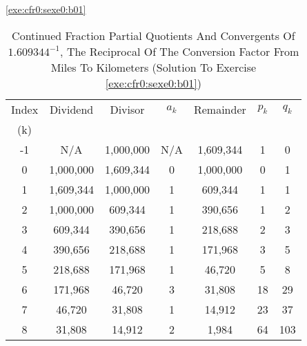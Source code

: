 \begin{vworkexercisesolution}{\ref{exe:cfr0:sexe0:b01}}
\begin{table}
\caption{Continued Fraction Partial Quotients And Convergents Of $1.609344^{-1}$, 
         The Reciprocal Of The Conversion Factor From Miles
         To Kilometers (Solution To Exercise \ccfrzeroxrefhyphen{}\ref{exe:cfr0:sexe0:b01})}
\label{tbl:ccfs0:exe:cfr0:sexe0:b01:01}
\begin{center}
\begin{tabular}{|c|c|c|c|c|c|c|}
\hline
\small{Index}     &      \small{Dividend}  &       \small{Divisor} &  $a_k$ &   \small{Remainder} & $p_k$ & $q_k$ \\
\small{(k)}       &                        &                       &        &                     &       &       \\
\hline
\hline
       \small{-1} & \small{N/A}            & \small{1,000,000}     &     \small{N/A} &   \small{1,609,344}   &      \small{1} &       \small{0}  \\
\hline
       \small{0}  & \small{1,000,000}      & \small{1,609,344}     &     \small{0}   &   \small{1,000,000}   &      \small{0} &       \small{1}  \\
\hline
       \small{1}  & \small{1,609,344}      & \small{1,000,000}     &     \small{1}   &     \small{609,344}   &      \small{1} &       \small{1}  \\
\hline
       \small{2}  & \small{1,000,000}      &   \small{609,344}     &     \small{1}   &     \small{390,656}   &      \small{1} &       \small{2}  \\
\hline
       \small{3}  &   \small{609,344}      &   \small{390,656}     &     \small{1}   &     \small{218,688}   &      \small{2} &       \small{3}  \\
\hline
       \small{4}  &   \small{390,656}      &   \small{218,688}     &     \small{1}   &     \small{171,968}   &      \small{3} &       \small{5}  \\
\hline
       \small{5}  &   \small{218,688}      &   \small{171,968}     &     \small{1}   &      \small{46,720}   &      \small{5} &       \small{8}  \\
\hline
       \small{6}  &   \small{171,968}      &    \small{46,720}     &     \small{3}   &      \small{31,808}   &     \small{18} &      \small{29}  \\
\hline
       \small{7}  &    \small{46,720}      &    \small{31,808}     &     \small{1}   &      \small{14,912}   &     \small{23} &      \small{37}  \\
\hline
       \small{8}  &    \small{31,808}      &    \small{14,912}     &     \small{2}   &       \small{1,984}   &     \small{64} &     \small{103}  \\

\end{tabular}
\end{center}
\end{table}
\end{vworkexercisesolution}
